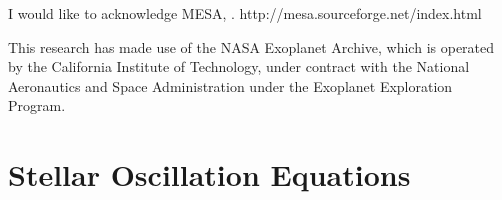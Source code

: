 \documentclass[11pt]{amsart}
\begin{document}
I would like to acknowledge MESA, \cite{Paxton2011}. http://mesa.sourceforge.net/index.html

This research has made use of the NASA Exoplanet Archive, which is operated by the California Institute of Technology, under contract with the National Aeronautics and Space Administration under the Exoplanet Exploration Program.









\newpage

\appendix

\section{Stellar Oscillation Equations} \label{ap:Osc}
\end{document}
